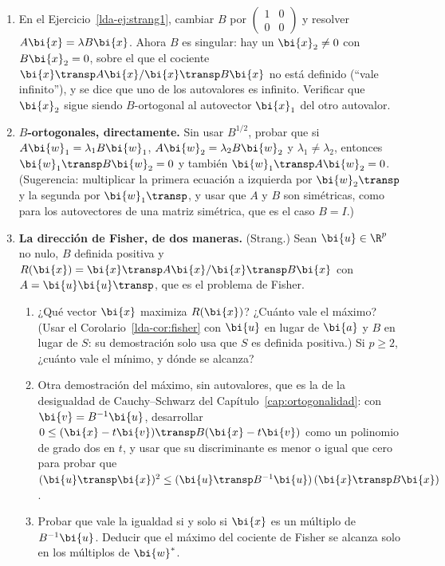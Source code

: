 \begin{enumerate}[leftmargin=*,label=\textbf{\thechapter.\arabic*},ref=\thechapter.\arabic*,itemsep=4pt]
\item {}\label{lda-ej:strang4} En el
Ejercicio~\ref{lda-ej:strang1}, cambiar $B$ por
$\left(\begin{smallmatrix}1&0\\0&0\end{smallmatrix}\right)$ y resolver
$A\bi{x}=\lambda B\bi{x}$. Ahora $B$ es singular: hay un $\bi{x}_2\ne0$ con $B\bi{x}_2=0$, sobre el
que el cociente $\bi{x}\transp A\bi{x}/\bi{x}\transp B\bi{x}$ no está definido (``vale
infinito''), y se dice que uno de los autovalores es infinito. Verificar que
$\bi{x}_2$ sigue siendo $B$-ortogonal al autovector $\bi{x}_1$ del otro autovalor.

\item {} \textbf{$B$-ortogonales, directamente.}\label{lda-ej:Bortogonal}
Sin usar $B^{1/2}$, probar que si $A\bi{w}_1=\lambda_1B\bi{w}_1$, $A\bi{w}_2=\lambda_2B\bi{w}_2$ y
$\lambda_1\ne\lambda_2$, entonces $\bi{w}_1\transp B\bi{w}_2=0$ y también
$\bi{w}_1\transp A\bi{w}_2=0$. (Sugerencia: multiplicar la primera ecuación a izquierda
por $\bi{w}_2\transp$ y la segunda por $\bi{w}_1\transp$, y usar que $A$ y $B$ son
simétricas, como para los autovectores de una matriz simétrica, que es el caso
$B=I$.)

\item {} \textbf{La dirección de Fisher, de dos maneras.}\label{lda-ej:strang8}
(Strang.) Sean $\bi{u}\in\R^p$ no nulo, $B$ definida positiva y
$R(\bi{x})=\bi{x}\transp A\bi{x}/\bi{x}\transp B\bi{x}$ con $A=\bi{u}\bi{u}\transp$, que es el problema de Fisher.
\begin{enumerate}[label=(\alph*)]
\item ¿Qué vector $\bi{x}$ maximiza $R(\bi{x})$? ¿Cuánto vale el máximo? (Usar el
Corolario~\ref{lda-cor:fisher} con $\bi{u}$ en lugar de $\bi{a}$ y $B$ en lugar de
$S$: su demostración solo usa que $S$ es definida positiva.) Si $p\ge2$,
¿cuánto vale el mínimo, y dónde se alcanza?
\item Otra demostración del máximo, sin autovalores, que es la de la
desigualdad de Cauchy--Schwarz del Capítulo~\ref{cap:ortogonalidad}: con
$\bi{v}=B^{-1}\bi{u}$, desarrollar $0\le(\bi{x}-t\bi{v})\transp B(\bi{x}-t\bi{v})$ como un polinomio de
grado dos en $t$, y usar que su discriminante es menor o igual que cero para
probar que $(\bi{u}\transp \bi{x})^2\le(\bi{u}\transp B^{-1}\bi{u})\,(\bi{x}\transp B\bi{x})$.
\item Probar que vale la igualdad si y solo si $\bi{x}$ es un múltiplo de
$B^{-1}\bi{u}$. Deducir que el máximo del cociente de Fisher se alcanza solo en
los múltiplos de $\bi{w}^\ast$.
\end{enumerate}


\end{enumerate}
